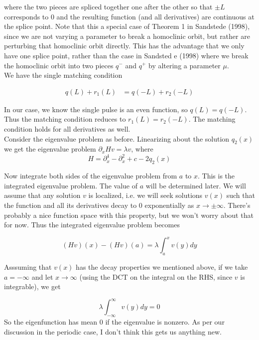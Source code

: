 \documentclass[12pt]{article}
\begin{document}
where the two pieces are spliced together one after the other so that $\pm L$ corresponds to 0 and the resulting function (and all derivatives) are continuous at the splice point. Note that this a special case of Theorem 1 in Sandstede (1998), since we are not varying a parameter to break a homoclinic orbit, but rather are perturbing that homoclinic orbit directly. This has the advantage that we only have one splice point, rather than the case in Sandsted e (1998) where we break the homoclinic orbit into two pieces $q^-$ and $q^+$ by altering a parameter $\mu$.
\\

We have the single matching condition

\begin{align*}
q(L) + r_1(L) &= q(-L) + r_2(-L)
\end{align*}

In our case, we know the single pulse is an even function, so $q(L) = q(-L)$. Thus the matching condition reduces to $r_1(L) = r_2(-L)$. The matching condition holds for all derivatives as well. \\

Consider the eigenvalue problem as before. Linearizing about the solution $q_2(x)$ we get the eigenvalue problem $\partial_x H v = \lambda v$, where 
\begin{equation}\label{hamiltonian}
H = \partial_x^4 - \partial_x^2 + c - 2 q_2(x)
\end{equation}

Now integrate both sides of the eigenvalue problem from $a$ to $x$. This is the integrated eigenvalue problem. The value of $a$ will be determined later. We will assume that any solution $v$ is localized, i.e. we will seek solutions $v(x)$ such that the function and all its derivatives decay to 0 exponentially as $x \rightarrow \pm \infty$. There's probably a nice function space with this property, but we won't worry about that for now. Thus the integrated eigenvalue problem becomes

\begin{equation}\label{inteigproblem}
(Hv)(x) - (Hv)(a) = \lambda \int_{a}^x v(y) dy
\end{equation}

Asssuming that $v(x)$ has the decay properties we mentioned above, if we take $a = -\infty$ and let $x \rightarrow \infty$ (using the DCT on the integral on the RHS, since $v$ is integrable), we get

\[
\lambda \int_{-\infty}^\infty v(y) dy = 0
\]
So the eigenfunction has mean 0 if the eigenvalue is nonzero. As per our discussion in the periodic case, I don't think this gets us anything new.\\
\end{document}
